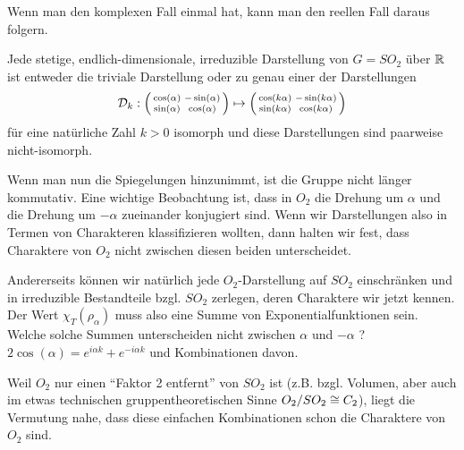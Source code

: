 \begin{remark}
Wenn man den komplexen Fall einmal hat, kann man den reellen Fall daraus folgern.
\end{remark}

\begin{corollary}[Darstellungstheorie von $SO_2$ über $\IK=\IR$]
Jede stetige, endlich-dimensionale, irreduzible Darstellung von $G=SO_2$ über $\mathbb{R}$ ist entweder die triviale Darstellung oder zu genau einer der Darstellungen
\[\mathcal{D}_k : \begin{psmallmatrix}\cos(\alpha)&-\sin(\alpha)\\\sin(\alpha)&\cos(\alpha)\end{psmallmatrix} \mapsto \begin{psmallmatrix}\cos(k\alpha)&-\sin(k\alpha)\\\sin(k\alpha)&\cos(k\alpha)\end{psmallmatrix}\]
für eine natürliche Zahl $k>0$ isomorph und diese Darstellungen sind paarweise nicht-isomorph.
\end{corollary}

\begin{remark}
Wenn man nun die Spiegelungen hinzunimmt, ist die Gruppe nicht länger kommutativ. Eine wichtige Beobachtung ist, dass in $O_2$ die Drehung um $\alpha$ und die Drehung um $-\alpha$ zueinander konjugiert sind. Wenn wir Darstellungen also in Termen von Charakteren klassifizieren wollten, dann halten wir fest, dass Charaktere von $O_2$ nicht zwischen diesen beiden unterscheidet.

Andererseits können wir natürlich jede $O_2$-Darstellung auf $SO_2$ einschränken und in irreduzible Bestandteile bzgl. $SO_2$ zerlegen, deren Charaktere wir jetzt kennen. Der Wert $\chi_T(\rho_\alpha)$ muss also eine Summe von Exponentialfunktionen sein. Welche solche Summen unterscheiden nicht zwischen $\alpha$ und $-\alpha$ ? $2\cos(\alpha) = e^{i\alpha k} + e^{-i\alpha k}$ und Kombinationen davon.

Weil $O_2$ nur einen \enquote{Faktor 2 entfernt} von $SO_2$ ist (z.B. bzgl. Volumen, aber auch im etwas technischen gruppentheoretischen Sinne $O_2 / SO_2 \cong C_2$), liegt die Vermutung nahe, dass diese einfachen Kombinationen schon die Charaktere von $O_2$ sind. 
\end{remark}

